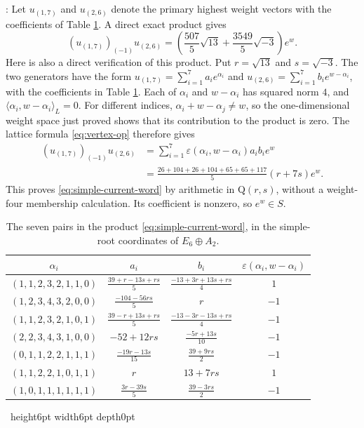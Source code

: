 \documentclass[leqno]{article}
\newcommand{\Q}{\mathrm{Q}}
\newcommand{\qed}{\hfill \vrule height6pt  width6pt depth0pt}
\newcommand{\epsi}{\varepsilon}
\newenvironment{proof}[1][]{\noindent {\it Proof #1} : }{\hbox{~}\qed
\smallskip
}
\numberwithin{equation}{section}
\begin{document}
\begin{proof}
Let $u_{(1,7)}$ and $u_{(2,6)}$ denote the primary highest weight vectors with the coefficients of Table \ref{tab:simple-current-coefficients}. A direct exact product gives
\begin{equation}
\label{eq:simple-current-word}
(u_{(1,7)})_{(-1)}u_{(2,6)} = \left(\frac{507}{5}\sqrt{13} + \frac{3549}{5}\sqrt{-3}\right)e^w.
\end{equation}
Here is also a direct verification of this product. Put $r = \sqrt{13}$ and $s = \sqrt{-3}$. The two generators have the form $u_{(1,7)} = \sum_{i=1}^7 a_i e^{\alpha_i}$ and $u_{(2,6)} = \sum_{i=1}^7 b_i e^{w-\alpha_i}$, with the coefficients in Table \ref{tab:simple-current-coefficients}. Each of $\alpha_i$ and $w-\alpha_i$ has squared norm $4$, and $\langle\alpha_i,w-\alpha_i\rangle_L = 0$. For different indices, $\alpha_i+w-\alpha_j \neq w$, so the one-dimensional weight space just proved shows that its contribution to the product is zero. The lattice formula \eqref{eq:vertex-op} therefore gives
\begin{equation}
\label{eq:simple-current-sum}
\begin{aligned}
(u_{(1,7)})_{(-1)}u_{(2,6)} &= \sum_{i=1}^7 \epsi(\alpha_i,w-\alpha_i)a_i b_i e^w\\
&= \frac{26+104+26+104+65+65+117}{5}(r+7s)e^w.
\end{aligned}
\end{equation}
This proves \eqref{eq:simple-current-word} by arithmetic in $\Q(r,s)$, without a weight-four membership calculation. Its coefficient is nonzero, so $e^w \in S$.

\begin{table}[htbp]
\centering
\small
\renewcommand{\arraystretch}{1.4}
\begin{tabular}{cccc}
\hline
$\alpha_i$ & $a_i$ & $b_i$ & $\epsi(\alpha_i,w-\alpha_i)$\\
\hline
$(1,1,2,3,2,1,1,0)$ & $\frac{39+r-13s+rs}{5}$ & $\frac{-13+3r+13s+rs}{4}$ & $1$\\
$(1,2,3,4,3,2,0,0)$ & $\frac{-104-56rs}{5}$ & $r$ & $-1$\\
$(1,1,2,3,2,1,0,1)$ & $\frac{39-r+13s+rs}{5}$ & $\frac{-13-3r-13s+rs}{4}$ & $-1$\\
$(2,2,3,4,3,1,0,0)$ & $-52+12rs$ & $\frac{-5r+13s}{10}$ & $-1$\\
$(0,1,1,2,2,1,1,1)$ & $\frac{-19r-13s}{15}$ & $\frac{39+9rs}{2}$ & $-1$\\
$(1,1,2,2,1,0,1,1)$ & $r$ & $13+7rs$ & $1$\\
$(1,0,1,1,1,1,1,1)$ & $\frac{3r-39s}{5}$ & $\frac{39-3rs}{2}$ & $-1$\\
\hline
\end{tabular}
\caption{The seven pairs in the product \eqref{eq:simple-current-word}, in the simple-root coordinates of $E_6 \oplus A_2$.}
\label{tab:simple-current-coefficients}
\end{table}


\end{proof}
\end{document}
